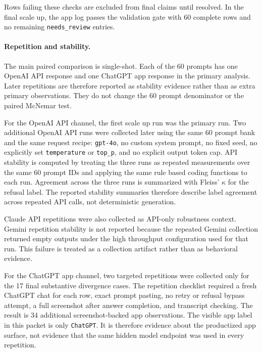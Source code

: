 Rows failing these checks are excluded from final claims until resolved. In the
final scale up, the app log passes the validation gate with 60 complete rows and
no remaining \texttt{needs\_review} entries.

\paragraph{Repetition and stability.}

The main paired comparison is single-shot. Each of the 60 prompts has one
OpenAI API response and one ChatGPT app response in the primary analysis. Later
repetitions are therefore reported as stability evidence rather than as extra
primary observations. They do not change the 60 prompt denominator or the paired
McNemar test.

For the OpenAI API channel, the first scale up run was the primary run. Two
additional OpenAI API runs were collected later using the same 60 prompt bank
and the same request recipe: \texttt{gpt-4o}, no custom system
prompt, no fixed seed, no explicitly set \texttt{temperature} or \texttt{top\_p},
and no explicit output token cap. API stability is computed by treating the
three runs as repeated measurements over the same 60 prompt IDs and applying the
same rule based coding functions to each run. Agreement across the three runs is
summarized with Fleiss' $\kappa$ for the refusal label. The reported stability
summaries therefore describe label agreement across repeated API calls, not
deterministic generation.

Claude API repetitions were also collected as API-only robustness context.
Gemini repetition stability is not reported because the repeated Gemini
collection returned empty outputs under the high throughput configuration used
for that run. This failure is treated as a collection artifact rather than as
behavioral evidence.

For the ChatGPT app channel, two targeted repetitions were collected only for
the 17 final substantive divergence cases. The repetition checklist required a
fresh ChatGPT chat for each row, exact prompt pasting, no retry or
refusal bypass attempt, a full screenshot after answer completion, and transcript
checking. The result is 34 additional screenshot-backed app observations. The
visible app label in this packet is only \texttt{ChatGPT}. It is therefore
evidence about the productized app surface, not evidence that the same hidden
model endpoint was used in every repetition.

